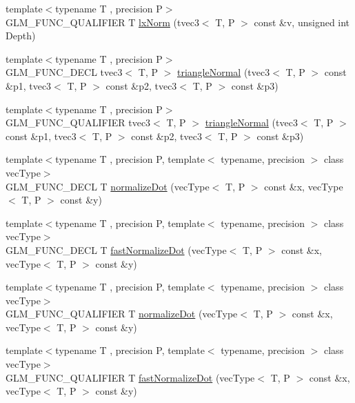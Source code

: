 \begin{DoxyCompactItemize}
\item 
{\footnotesize template$<$typename T , precision P$>$ }\\G\+L\+M\+\_\+\+F\+U\+N\+C\+\_\+\+Q\+U\+A\+L\+I\+F\+I\+E\+R T \hyperlink{group__gtx__norm_gaab931b0d1acfe2f9c1cb78311edf24fc}{lx\+Norm} (tvec3$<$ T, P $>$ const \&v, unsigned int Depth)
\item 
{\footnotesize template$<$typename T , precision P$>$ }\\G\+L\+M\+\_\+\+F\+U\+N\+C\+\_\+\+D\+E\+C\+L tvec3$<$ T, P $>$ \hyperlink{group__gtx__normal_ga7842850bcda582f1756883e3ed950e14}{triangle\+Normal} (tvec3$<$ T, P $>$ const \&p1, tvec3$<$ T, P $>$ const \&p2, tvec3$<$ T, P $>$ const \&p3)
\item 
{\footnotesize template$<$typename T , precision P$>$ }\\G\+L\+M\+\_\+\+F\+U\+N\+C\+\_\+\+Q\+U\+A\+L\+I\+F\+I\+E\+R tvec3$<$ T, P $>$ \hyperlink{group__gtx__normal_ga7842850bcda582f1756883e3ed950e14}{triangle\+Normal} (tvec3$<$ T, P $>$ const \&p1, tvec3$<$ T, P $>$ const \&p2, tvec3$<$ T, P $>$ const \&p3)
\item 
{\footnotesize template$<$typename T , precision P, template$<$ typename, precision $>$ class vec\+Type$>$ }\\G\+L\+M\+\_\+\+F\+U\+N\+C\+\_\+\+D\+E\+C\+L T \hyperlink{group__gtx__normalize__dot_gaffbc2f2cb15838de8886a68048f9004d}{normalize\+Dot} (vec\+Type$<$ T, P $>$ const \&x, vec\+Type$<$ T, P $>$ const \&y)
\item 
{\footnotesize template$<$typename T , precision P, template$<$ typename, precision $>$ class vec\+Type$>$ }\\G\+L\+M\+\_\+\+F\+U\+N\+C\+\_\+\+D\+E\+C\+L T \hyperlink{group__gtx__normalize__dot_ga8593b21bc2fe22184f01d5e08b5a2024}{fast\+Normalize\+Dot} (vec\+Type$<$ T, P $>$ const \&x, vec\+Type$<$ T, P $>$ const \&y)
\item 
{\footnotesize template$<$typename T , precision P, template$<$ typename, precision $>$ class vec\+Type$>$ }\\G\+L\+M\+\_\+\+F\+U\+N\+C\+\_\+\+Q\+U\+A\+L\+I\+F\+I\+E\+R T \hyperlink{group__gtx__normalize__dot_gaffbc2f2cb15838de8886a68048f9004d}{normalize\+Dot} (vec\+Type$<$ T, P $>$ const \&x, vec\+Type$<$ T, P $>$ const \&y)
\item 
{\footnotesize template$<$typename T , precision P, template$<$ typename, precision $>$ class vec\+Type$>$ }\\G\+L\+M\+\_\+\+F\+U\+N\+C\+\_\+\+Q\+U\+A\+L\+I\+F\+I\+E\+R T \hyperlink{group__gtx__normalize__dot_ga8593b21bc2fe22184f01d5e08b5a2024}{fast\+Normalize\+Dot} (vec\+Type$<$ T, P $>$ const \&x, vec\+Type$<$ T, P $>$ const \&y)

\end{DoxyCompactItemize}
